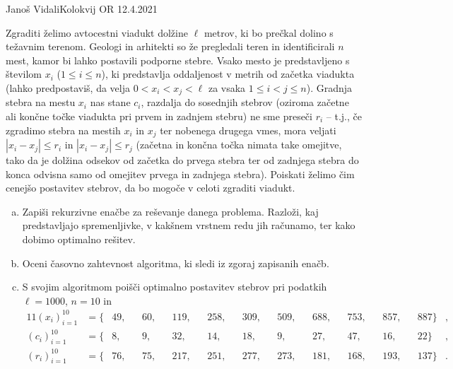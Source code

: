 \begin{naloga}{Janoš Vidali}{Kolokvij OR 12.4.2021}
\begin{vprasanje}
Zgraditi želimo avtocestni viadukt dolžine $\ell$ metrov,
ki bo prečkal dolino s težavnim terenom.
Geologi in arhitekti so že pregledali teren in identificirali $n$ mest,
kamor bi lahko postavili podporne stebre.
Vsako mesto je predstavljeno s številom $x_i$ ($1 \le i \le n$),
ki predstavlja oddaljenost v metrih od začetka viadukta
(lahko predpostaviš,
da velja $0 < x_i < x_j < \ell$ za vsaka $1 \le i < j \le n$).
Gradnja stebra na mestu $x_i$ nas stane $c_i$,
razdalja do sosednjih stebrov
(oziroma začetne ali končne točke viadukta pri prvem in zadnjem stebru)
ne sme preseči $r_i$
-- t.j., če zgradimo stebra na mestih $x_i$ in $x_j$ ter nobenega drugega vmes,
mora veljati $|x_i - x_j| \le r_i$ in $|x_i - x_j| \le r_j$
(začetna in končna točka nimata take omejitve,
tako da je dolžina odsekov od začetka do prvega stebra
ter od zadnjega stebra do konca
odvisna samo od omejitev prvega in zadnjega stebra).
Poiskati želimo čim cenejšo postavitev stebrov,
da bo mogoče v celoti zgraditi viadukt.

\begin{enumerate}[(a)]
\item Zapiši rekurzivne enačbe za reševanje danega problema.
Razloži, kaj pred\-stav\-lja\-jo spremenljivke,
v kakšnem vrstnem redu jih računamo,
ter kako dobimo optimalno rešitev.

\item Oceni časovno zahtevnost algoritma, ki sledi iz zgoraj zapisanih enačb.

\item S svojim algoritmom poišči optimalno postavitev stebrov pri podatkih $\ell = 1000$, $n = 10$ in
\begin{alignat*}{11}
(x_i)_{i=1}^{10} &= \{&{} 49, &&{} 60, &&{} 119, &&{} 258, &&{} 309, &&{} 509, &&{} 688, &&{} 753, &&{} 857, &&{} 887\} &, \\
(c_i)_{i=1}^{10} &= \{&{} 8, &&{} 9, &&{} 32, &&{} 14, &&{} 18, &&{} 9, &&{} 27, &&{} 47, &&{} 16, &&{} 22\} &, \\
(r_i)_{i=1}^{10} &= \{&{} 76, &&{} 75, &&{} 217, &&{} 251, &&{} 277, &&{} 273, &&{} 181, &&{} 168, &&{} 193, &&{} 137\} &.
\end{alignat*}
\end{enumerate}
\end{vprasanje}


\end{naloga}
